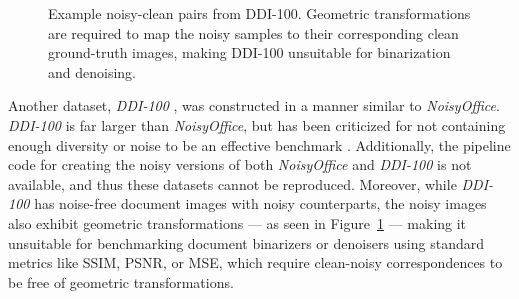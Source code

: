 \documentclass[runningheads]{llncs}
\begin{document}
\begin{figure}
    \centering{}
    \caption{Example noisy-clean pairs from DDI-100. Geometric transformations are required to map the noisy samples to their corresponding clean ground-truth images, making DDI-100 unsuitable for binarization and denoising.}
    \label{fig:ddi-100-samples}
\end{figure}

Another dataset, \emph{DDI-100} \cite{ddi-100-2019}, was constructed in a manner similar to \emph{NoisyOffice}.
\emph{DDI-100} is far larger than \emph{NoisyOffice}, but has been criticized for not containing enough diversity or noise to be an effective benchmark \cite{detection-masking-2022}.
Additionally, the pipeline code for creating the noisy versions of both \emph{NoisyOffice} and \emph{DDI-100} is not available, and thus these datasets cannot be reproduced.
Moreover, while \emph{DDI-100} has noise-free document images with noisy counterparts, the noisy images also exhibit geometric transformations --- as seen in Figure~\ref{fig:ddi-100-samples} --- making it unsuitable for benchmarking document binarizers or denoisers using standard metrics like SSIM, PSNR, or MSE, which require clean-noisy correspondences to be free of geometric transformations.
\end{document}
